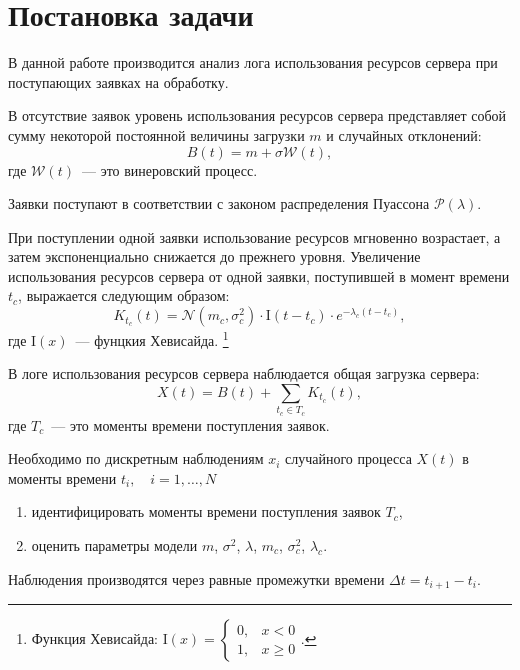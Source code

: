 \documentclass[a4paper,10pt]{article}
\begin{document}

\tableofcontents
\pagebreak


\section{Постановка задачи}
В данной работе производится анализ лога использования ресурсов сервера
при поступающих заявках на обработку.

В отсутствие заявок уровень использования ресурсов сервера представляет собой 
сумму некоторой постоянной величины загрузки $m$ и случайных отклонений:
$$B(t) = m + \sigma \mathcal{W}(t),$$
где $\mathcal{W}(t)$~--- это винеровский процесс. 

Заявки поступают в соответствии с законом распределения Пуассона 
$\mathcal{P}(\lambda)$.

При поступлении одной заявки использование ресурсов мгновенно возрастает,
а затем экспоненциально снижается до прежнего уровня.
Увеличение использования ресурсов сервера от одной заявки, 
поступившей в момент времени $t_c$, выражается следующим образом:
$$K_{t_c}(t) = \mathcal{N}(m_c, \sigma_c^2) \cdot \mathrm{I}(t - t_c) \cdot 
    e^{-\lambda_c(t - t_c)},$$
где $\mathrm{I}(x)$~--- фунцкия Хевисайда.%
\footnote{%
Функция Хевисайда: $\mathrm{I}(x) = \left\{
  \begin{array}{rl}
    0, & x < 0 \\
    1, & x \geqslant 0
  \end{array}\right.$.
}

В логе использования ресурсов сервера наблюдается общая загрузка сервера:
$$X(t) = B(t) + \sum\limits_{t_c \in T_c}K_{t_c}(t),$$
где $T_c$~--- это моменты времени поступления заявок.

Необходимо по дискретным наблюдениям $x_i$ случайного процесса $X(t)$ 
в моменты времени $t_i, \quad i=1,\ldots,N$
\begin{enumerate}
 \item идентифицировать моменты времени поступления заявок $T_c$,
 \item оценить параметры модели $m$, $\sigma^2$, $\lambda$, $m_c$, 
 $\sigma_c^2$, $\lambda_c$.
\end{enumerate}
Наблюдения производятся через равные промежутки времени 
$\Delta t = t_{i+1} - t_i.$
\end{document}
